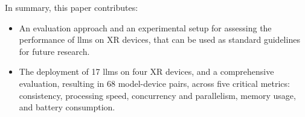  In summary, this paper contributes: 
\begin{itemize}[noitemsep,leftmargin=8pt, topsep=0pt]
\item An evaluation approach and an experimental setup for assessing the performance of \glspl{llm} on XR devices, that can be used as standard  guidelines for future research.
\item The deployment of 17 \glspl{llm} on four XR devices, and a comprehensive evaluation, resulting in 68 model-device pairs, across five critical metrics: consistency, processing speed, concurrency and parallelism, memory usage,   and battery consumption.
\end{itemize}